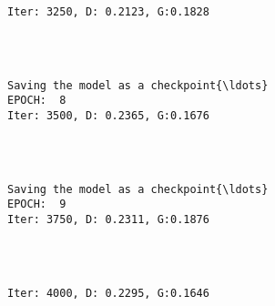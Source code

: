 \documentclass[11pt]{article}
\begin{document}
    \begin{Verbatim}[commandchars=\\\{\}]

Iter: 3250, D: 0.2123, G:0.1828
    \end{Verbatim}

    \begin{center}
    \end{center}
    { \hspace*{\fill} \\}
    
    \begin{Verbatim}[commandchars=\\\{\}]

Saving the model as a checkpoint{\ldots}
EPOCH:  8
Iter: 3500, D: 0.2365, G:0.1676
    \end{Verbatim}

    \begin{center}
    \end{center}
    { \hspace*{\fill} \\}
    
    \begin{Verbatim}[commandchars=\\\{\}]

Saving the model as a checkpoint{\ldots}
EPOCH:  9
Iter: 3750, D: 0.2311, G:0.1876
    \end{Verbatim}

    \begin{center}
    \end{center}
    { \hspace*{\fill} \\}
    
    \begin{Verbatim}[commandchars=\\\{\}]

Iter: 4000, D: 0.2295, G:0.1646
    \end{Verbatim}

    \begin{center}
    \end{center}
    { \hspace*{\fill} \\}
    
\end{document}
